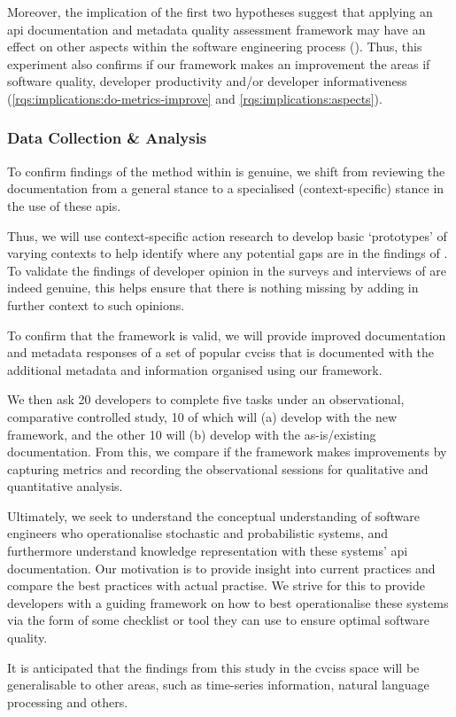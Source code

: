 Moreover, the implication of the first two hypotheses suggest that applying an \gls{api} documentation and metadata quality assessment framework may have an effect on other aspects within the software engineering process (). Thus, this experiment also confirms if our framework makes an improvement the areas if software quality, developer productivity and/or developer informativeness (\ref{rqs:implications:do-metrics-improve} and \ref{rqs:implications:aspects}).

\subsubsection{Data Collection \& Analysis}

To confirm findings of the method within  is genuine, we shift from reviewing the documentation from a general stance to a specialised (context-specific) stance in the use of these \glspl{api}.

Thus, we will use context-specific action research to develop basic `prototypes' of varying contexts to help identify where any potential gaps are in the findings of .
To validate the findings of developer opinion in the surveys and interviews of  are indeed genuine, this helps ensure that there is nothing missing by adding in further context to such opinions.

To confirm that the framework is valid, we will provide improved documentation and metadata responses of a set of popular \glspl{cvcis} that is documented with the additional metadata and information organised using our framework.

We then ask 20 developers to complete five tasks under an observational, comparative controlled study, 10 of which will (a) develop with the new framework, and the other 10 will (b) develop with the as-is/existing documentation. From this, we compare if the framework makes improvements by capturing metrics and recording the observational sessions for qualitative and quantitative analysis.

Ultimately, we seek to understand the conceptual understanding of software engineers who operationalise stochastic and probabilistic systems, and furthermore understand knowledge representation with these systems' \gls{api} documentation. Our motivation is to provide insight into current practices and compare the best practices with actual practise. We strive for this to  provide developers with a guiding framework on how to best operationalise these systems via the form of some checklist or tool they can use to ensure optimal software quality.

It is anticipated that the findings from this study in the \glspl{cvcis} space will be generalisable to other areas, such as time-series information, natural language processing and others.

\\
